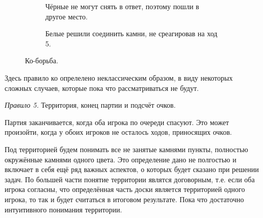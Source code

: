 \documentclass[14pt,a4paper]{extarticle}
\newcommand{\stone}[3]{\filldraw[color=black, fill=#3, very thick](#1,#2) circle(0.45);}
\newcommand{\stonelabel}[4]{\node[text=#3] at (#1,#2) {#4};}
\begin{document}
\begin{figure}[H]
    \begin{subfigure}[t]{0.4\textwidth}
    \caption{Чёрные не могут снять в ответ, поэтому пошли в другое место.}
    \label{9e}
    \end{subfigure}
    \hfill
    \begin{subfigure}[t]{0.4\textwidth}
    \caption{Белые решили соединить камни, не среагировав на ход 5.}
    \label{9f}
    \end{subfigure}
    \caption{Ко-борьба.}
    \label{9}
\end{figure}

Здесь правило ко опрелелено неклассическим образом, в виду некоторых сложных случаев, которые пока что рассматриваться не будут.

\textit{Правило 5.} Территория, конец партии и подсчёт очков.

Партия заканчивается, когда оба игрока по очереди спасуют. Это может произойти, когда у обоих игроков не осталось ходов, приносящих очков.

Под территорией будем понимать все не занятые камнями пункты, полностью окружённые камнями одного цвета. Это определение дано не полгостью и включает в себя ещё ряд важных аспектов, о которых будет сказано при решении задач. По большей части понятие территории являтся договорным, т.е. если оба игрока согласны, что определённая часть доски является территорией одного игрока, то так и будет считаться в итоговом результате. Пока что достаточно интуитивного понимания территории.
\end{document}
